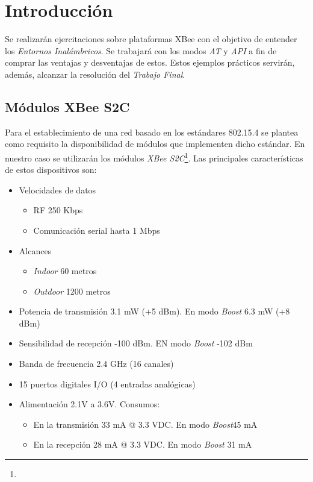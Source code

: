 \documentclass[11pt,oneside,spanish,a4paper]{article}
\begin{document}
\section{Introducción}
\label{sec:intro}

Se realizarán ejercitaciones sobre plataformas XBee con el objetivo
de entender los \emph{Entornos Inalámbricos}. Se trabajará con los
modos \emph{AT} y \emph{API} a fin de comprar las ventajas y
desventajas de estos. Estos ejemplos prácticos servirán, además,
alcanzar la resolución del \emph{Trabajo Final}.

\subsection{Módulos XBee S2C}
\label{sec:xbee-mod}

Para el establecimiento de una red basado en los estándares 802.15.4
se plantea como requisito la disponibilidad de módulos que implementen
dicho estándar. En nuestro caso se utilizarán los módulos \emph{XBee
  S2C}\footnote{}. Las
principales características de estos dispositivos son:
\begin{itemize}
\item Velocidades de datos
  \begin{itemize}
  \item RF 250 Kbps
  \item Comunicación serial hasta 1 Mbps
  \end{itemize}
\item Alcances
  \begin{itemize}
  \item \textsl{Indoor} 60 metros
  \item \textsl{Outdoor} 1200 metros
  \end{itemize}
\item Potencia de transmisión 3.1 mW (+5 dBm). En modo \textsl{Boost}
  6.3 mW (+8 dBm)
\item Sensibilidad de recepción -100 dBm. EN modo \textsl{Boost} -102
  dBm
\item Banda de frecuencia 2.4 GHz (16 canales)
\item 15 puertos digitales I/O (4 entradas analógicas)
\item Alimentación 2.1V a 3.6V. Consumos:
  \begin{itemize}
  \item En la transmisión 33 mA @ 3.3 VDC. En modo \textsl{Boost}45 mA
  \item En la recepción 28 mA @ 3.3 VDC. En modo \textsl{Boost} 31 mA
  \end{itemize}
\end{itemize}
\end{document}
